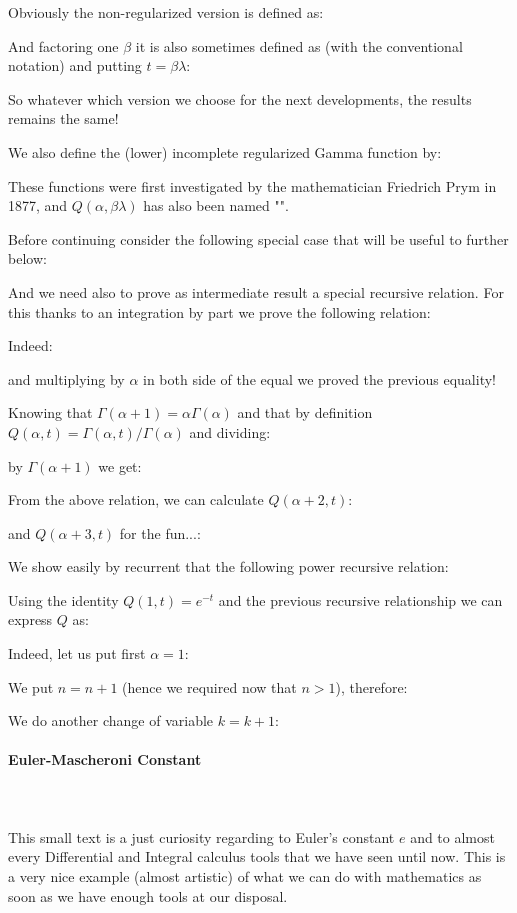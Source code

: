 	Obviously the non-regularized version is defined as:
	
	And factoring one $\beta$ it is also sometimes defined as (with the conventional notation) and putting $t=\beta\lambda$:
	
	So whatever which version we choose for the next developments, the results remains the same!
	\begin{tcolorbox}[title=Remark,colframe=black,arc=10pt]
	We also define the (lower) incomplete regularized Gamma function by:
	
	These functions were first investigated by the mathematician Friedrich Prym in 1877, and $Q(\alpha,\beta\lambda)$ has also been named "".
	\end{tcolorbox}
	Before continuing consider the following special case that will be useful to further below:
	
	And we need also to prove as intermediate result a special recursive relation. For this thanks to an integration by part we prove the following relation:
	
	Indeed:	
	
	and multiplying by $\alpha$ in both side of the equal we proved the previous equality!
	
	Knowing that $\Gamma(\alpha+1) = \alpha\Gamma(\alpha)$ and that by definition $Q(\alpha,t)=\Gamma(\alpha,t)/\Gamma(\alpha)$ and dividing:
	
	 by $\Gamma(\alpha + 1)$ we get:
	
	From the above relation, we can calculate $Q(\alpha+2,t)$:
	
	and $Q(\alpha+3,t)$ for the fun...:
	
	We show easily by recurrent that the following power recursive relation:
	
	Using the identity $Q(1,t)=e^{-t}$ and the previous recursive relationship we can express $Q$ as:
	
	Indeed, let us put first $\alpha=1$:
	
	We put $n=n+1$ (hence we required now that $n>1$), therefore:
	
	We do another change of variable $k=k+1$:
	
	
	\pagebreak
	\paragraph{Euler-Mascheroni Constant}\mbox{}\\\\
	This small text is a just curiosity regarding to Euler's constant $e$ and to almost every Differential and Integral calculus tools that we have seen until now. This is a very nice example (almost artistic) of what we can do with mathematics as soon as we have enough tools at our disposal.
	
